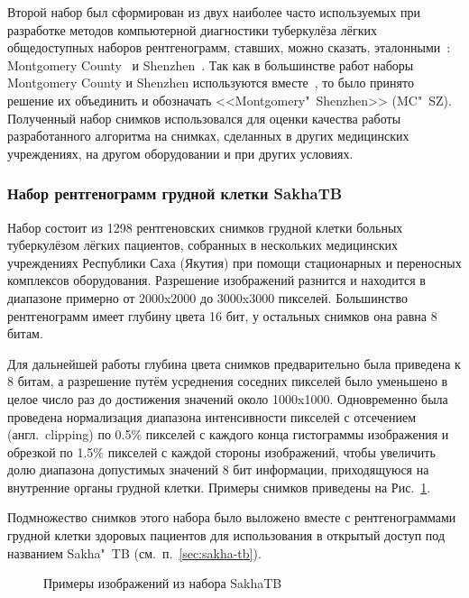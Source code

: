 Второй набор был сформирован из двух наиболее часто используемых при разработке методов компьютерной диагностики туберкулёза лёгких общедоступных наборов рентгенограмм, ставших, можно сказать, эталонными~\cite{oloko2022systematic, zeyu2022review, singh2022evolution, santosh2022advances}: Montgomery County~\cite{candemir2013lung} и Shenzhen~\cite{jaeger2013automatic}. Так как в большинстве работ наборы Montgomery County и Shenzhen используются вместе~\cite{oloko2022systematic, zeyu2022review}, то было принято решение их объединить и обозначать <<Montgomery"~Shenzhen>> (MC"~SZ). Полученный набор снимков использовался для оценки качества работы разработанного алгоритма на снимках, сделанных в других медицинских учреждениях, на другом оборудовании и при других условиях.

\subsubsection{Набор рентгенограмм грудной клетки SakhaTB} \label{subsubsec:dataset-yak-hardness}

Набор состоит из 1298 рентгеновских снимков грудной клетки больных туберкулёзом лёгких пациентов, собранных в нескольких медицинских учреждениях Республики Саха (Якутия) при помощи стационарных и переносных комплексов оборудования. Разрешение изображений разнится  и находится в диапазоне примерно от 2000x2000 до 3000x3000 пикселей. Большинство рентгенограмм имеет глубину цвета 16 бит, у остальных снимков она равна 8 битам.

Для дальнейшей работы глубина цвета снимков предварительно была приведена к 8 битам, а разрешение путём усреднения соседних пикселей было уменьшено в целое число раз до достижения значений около 1000x1000. Одновременно была проведена нормализация диапазона интенсивности пикселей с отсечением (англ.~clipping) по 0.5\% пикселей с каждого конца гистограммы изображения и обрезкой по 1.5\% пикселей с каждой стороны изображений, чтобы увеличить долю диапазона допустимых значений 8 бит информации, приходящуюся на внутренние органы грудной клетки. Примеры снимков приведены на Рис.~\ref{fig:samples-yak-hardness}.

Подмножество снимков этого набора было выложено вместе с рентгенограммами грудной клетки здоровых пациентов для использования в открытый доступ под названием Sakha"~TB (см.~п.~\ref{sec:sakha-tb}).

\begin{figure}[ht]
	\caption{Примеры изображений из набора SakhaTB}
	\label{fig:samples-yak-hardness}
\end{figure}

